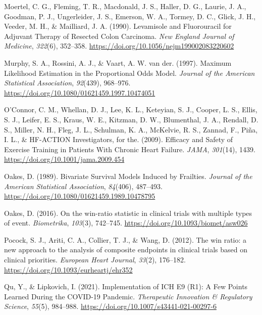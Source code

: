 \documentclass[
  letterpaper,
  DIV=11,
  numbers=noendperiod]{scrreprt}
\newlength{\cslhangindent}
\newlength{\cslentryspacingunit} %
\newenvironment{CSLReferences}[2] %
 {%
  \setlength{\parindent}{0pt}
  \ifodd #1
  \let\oldpar\par
  \def\par{\hangindent=\cslhangindent\oldpar}
  \fi
  \setlength{\parskip}{#2\cslentryspacingunit}
 }%
 {}
\begin{document}
\begin{CSLReferences}{1}{0}
\leavevmode{}%
Moertel, C. G., Fleming, T. R., Macdonald, J. S., Haller, D. G., Laurie,
J. A., Goodman, P. J., Ungerleider, J. S., Emerson, W. A., Tormey, D.
C., Glick, J. H., Veeder, M. H., \& Mailliard, J. A. (1990). Levamisole
and Fluorouracil for Adjuvant Therapy of Resected Colon Carcinoma.
\emph{New England Journal of Medicine}, \emph{322}(6), 352--358.
\url{https://doi.org/10.1056/nejm199002083220602}

\leavevmode{}%
Murphy, S. A., Rossini, A. J., \& Vaart, A. W. van der. (1997). Maximum
Likelihood Estimation in the Proportional Odds Model. \emph{Journal of
the American Statistical Association}, \emph{92}(439), 968--976.
\url{https://doi.org/10.1080/01621459.1997.10474051}

\leavevmode{}%
O'Connor, C. M., Whellan, D. J., Lee, K. L., Keteyian, S. J., Cooper, L.
S., Ellis, S. J., Leifer, E. S., Kraus, W. E., Kitzman, D. W.,
Blumenthal, J. A., Rendall, D. S., Miller, N. H., Fleg, J. L., Schulman,
K. A., McKelvie, R. S., Zannad, F., Piña, I. L., \& HF-ACTION
Investigators, for the. (2009). Efficacy and Safety of Exercise Training
in Patients With Chronic Heart Failure. \emph{JAMA}, \emph{301}(14),
1439. \url{https://doi.org/10.1001/jama.2009.454}

\leavevmode{}%
Oakes, D. (1989). Bivariate Survival Models Induced by Frailties.
\emph{Journal of the American Statistical Association}, \emph{84}(406),
487--493. \url{https://doi.org/10.1080/01621459.1989.10478795}

\leavevmode{}%
Oakes, D. (2016). On the win-ratio statistic in clinical trials with
multiple types of event. \emph{Biometrika}, \emph{103}(3), 742--745.
\url{https://doi.org/10.1093/biomet/asw026}

\leavevmode{}%
Pocock, S. J., Ariti, C. A., Collier, T. J., \& Wang, D. (2012). The win
ratio: a new approach to the analysis of composite endpoints in clinical
trials based on clinical priorities. \emph{European Heart Journal},
\emph{33}(2), 176--182. \url{https://doi.org/10.1093/eurheartj/ehr352}

\leavevmode{}%
Qu, Y., \& Lipkovich, I. (2021). Implementation of ICH E9 (R1): A Few
Points Learned During the COVID-19 Pandemic. \emph{Therapeutic
Innovation \& Regulatory Science}, \emph{55}(5), 984--988.
\url{https://doi.org/10.1007/s43441-021-00297-6}


\end{CSLReferences}
\end{document}
